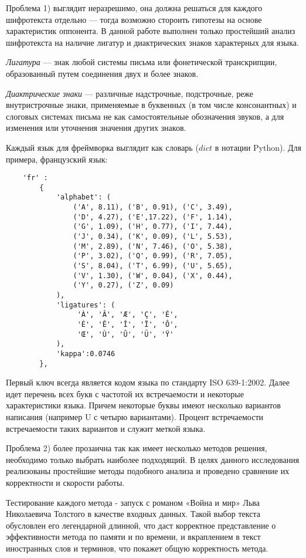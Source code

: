 Проблема 1) выглядит неразрешимо, она должна решаться для
каждого шифротекста отдельно — тогда возможно стороить гипотезы 
на основе характеристик оппонента. В данной работе выполнен только 
простейший анализ шифротекста на наличие лигатур и 
диактрических знаков характерных для языка.

\DEF\textit{Лигатура} — знак любой системы письма или 
фонетической транскрипции, образованный путем соединения 
двух и более знаков.

\DEF\textit{Диактрические знаки} — различные надстрочные, подстрочные,
реже внутристрочные знаки, применяемые в буквенных (в том числе 
консонантных) и слоговых системах письма не как самостоятельные 
обозначения звуков, а для изменения или уточнения значения других 
знаков.

Каждый язык для фреймворка выглядит как словарь ($dict$ в нотации
Python). Для примера, французский язык:

\begin{verbatim}
    'fr' :
        {
            'alphabet': (
                ('A', 8.11), ('B', 0.91), ('C', 3.49), 
                ('D', 4.27), ('E',17.22), ('F', 1.14), 
                ('G', 1.09), ('H', 0.77), ('I', 7.44), 
                ('J', 0.34), ('K', 0.09), ('L', 5.53), 
                ('M', 2.89), ('N', 7.46), ('O', 5.38), 
                ('P', 3.02), ('Q', 0.99), ('R', 7.05), 
                ('S', 8.04), ('T', 6.99), ('U', 5.65), 
                ('V', 1.30), ('W', 0.04), ('X', 0.44), 
                ('Y', 0.27), ('Z', 0.09)
            ),
            'ligatures': (
                 'À', 'Â', 'Æ', 'Ç', 'É', 
                 'È', 'Ê', 'Î', 'Ï', 'Ô', 
                 'Œ', 'Ù', 'Û', 'Ü', 'Ÿ' 
            ), 
            'kappa':0.0746 
        },
\end{verbatim}

Первый ключ всегда является кодом языка по стандарту ISO 639-1:2002.
Далее идет перечень всех букв с частотой их встречаемости и 
некоторые характеристики языка. Причем некоторые буквы имеют
несколько вариантов написания (например U с четырю вариантами).
Процент встречаемости встречаемости таких вариантов
и служит меткой языка.

Проблема 2) более прозаична так как имеет несколько методов 
решения, необходимо только выбрать наиболее подходящий.
В целях данного 
исследования реализованы простейшие методы подобного анализа и 
проведено сравнение их корректности и скорости работы.

Тестирование каждого метода - запуск с романом «Война и мир» Льва 
Николаевича 
Толстого в качестве входных данных. Такой выбор текста обусловлен его 
легендарной длинной, что даст корректное представление о эффективности 
метода по памяти и по времени, и вкраплением в текст иностранных слов 
и терминов, что покажет общую корректность метода.
